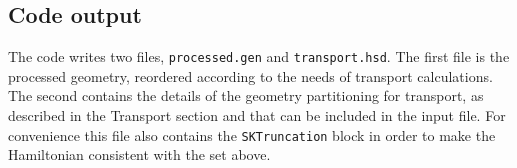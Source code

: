 \subsection{Code output}

The code writes two files, \verb|processed.gen| and \verb|transport.hsd|. The first file is the 
processed geometry, reordered according to the needs of transport calculations. The second 
contains the details of the geometry partitioning for transport, as described in the Transport 
section and that can be included in the input file.
For convenience this file also contains the \verb|SKTruncation| block in order to 
make the Hamiltonian consistent with the  set above. 


